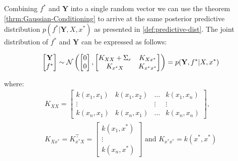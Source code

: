 
%


Combining $f^{\ast}$ and $\mathbf{Y}$ into a single random vector we can use the theorem \ref{thrm:Gaussian-Conditioning}
to arrive at the same posterior predictive distribution
$p(f^{\ast} | \mathbf{Y}, X, x^{\ast})$ as presented in \ref{def:predictive-dist}.
The joint distribution of $f^{\ast}$ and $\mathbf{Y}$ can be expressed as follows:

\begin{gather}
    \begin{bmatrix}
        \mathbf{Y} \\
        f^{\ast}
    \end{bmatrix}
    \sim \operatorname{\mathcal{N}} \left(
        \begin{bmatrix}
        0 \\
        0
        \end{bmatrix},
        \begin{bmatrix}
        K_{XX} + \Sigma_r & K_{Xx^{\ast}} \\
        K_{x^{\ast}X} & K_{x^{\ast}x^{\ast}}
        \end{bmatrix}
        \right)
    = p(\mathbf{Y}, f^{\ast}| X, x^{\ast})
\end{gather}

where:
\begin{gather*}
    K_{XX} =
    \begin{bmatrix}
        k(x_1, x_1) & k(x_1, x_2) & \dots & k(x_1, x_n)\\
        \vdots  &  & \vdots  & \vdots \\
        k(x_n, x_1)  & k(x_n, x_1) & \dots  & k(x_n, x_n)
    \end{bmatrix}, \\
    K_{Xx^{\ast}} = K_{x^{\ast}X}^{\top} =
    \begin{bmatrix}
        k(x_1, x^{\ast}) \\
        \vdots \\
        k(x_n,  x^{\ast})
    \end{bmatrix} \text{ and }
    K_{x^{\ast}x^{\ast}} = k(x^{\ast},x^{\ast})
\end{gather*}

